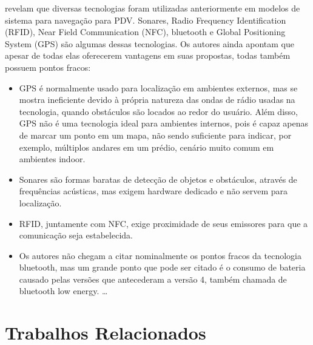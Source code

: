 \documentclass[english,brazilian]{UNISINOSmonografia}
\begin{document}
 revelam que diversas tecnologias foram utilizadas anteriormente em modelos de sistema para navegação para PDV. Sonares, Radio Frequency Identification (RFID), Near Field Communication (NFC), bluetooth e Global Positioning System (GPS) são algumas dessas tecnologias. Os autores ainda apontam que apesar de todas elas oferecerem vantagens em suas propostas, todas também possuem pontos fracos:

\begin{itemize}
  \item GPS é normalmente usado para localização em ambientes externos, mas se mostra ineficiente devido à própria natureza das ondas de rádio usadas na tecnologia, quando obstáculos são locados ao redor do usuário. Além disso, GPS não é uma tecnologia ideal para ambientes internos, pois é capaz apenas de marcar um ponto em um mapa, não sendo suficiente para indicar, por exemplo, múltiplos andares em um prédio, cenário muito comum em ambientes indoor. 
  \item Sonares são formas baratas de detecção de objetos e obstáculos, através de frequências acústicas, mas exigem hardware dedicado e não servem para localização.
  \item RFID, juntamente com NFC, exige proximidade de seus emissores para que a comunicação seja estabelecida.
  \item Os autores não chegam a citar nominalmente os pontos fracos da tecnologia bluetooth, mas um grande ponto que pode ser citado é o consumo de bateria causado pelas versões que antecederam a versão 4, também chamada de bluetooth low energy.    \ldots
\end{itemize}


\chapter{Trabalhos Relacionados}

\end{document}
